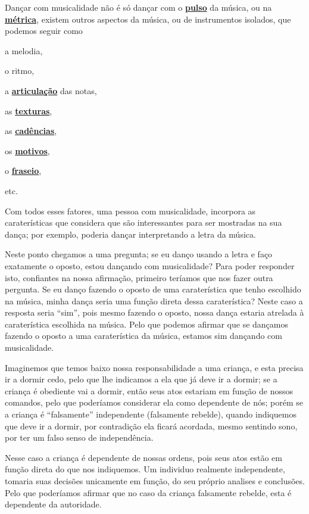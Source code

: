 Dançar com musicalidade não é só dançar com o \hyperref[ref:Pulso]{\textbf{pulso}} da música, 
ou na \hyperref[def:Metrica]{\textbf{métrica}},
existem outros aspectos da música, ou de instrumentos isolados, que podemos seguir como 
\begin{inparaitem} 
\item a melodia, 
\item o ritmo,
\item a \hyperref[sub:Articulation]{\textbf{articulação}} das notas, 
\item as \hyperref[sec:texturasmusica]{\textbf{texturas}}, 
\item as \hyperref[sec:Cadencia]{\textbf{cadências}}, 
\item os \hyperref[sec:Motivo]{\textbf{motivos}}, 
\item o \hyperref[sec:fraseio]{\textbf{fraseio}}, 
\item etc.
\end{inparaitem} 
Com todos esses fatores, uma pessoa com musicalidade, 
incorpora as caraterísticas que considera que são interessantes para 
ser mostradas na sua dança; por exemplo, poderia dançar interpretando a letra da música.

Neste ponto chegamos a uma pregunta; se eu danço usando a letra e faço exatamente o oposto,
estou dançando com musicalidade?
Para poder responder isto, confiantes na nossa afirmação,
primeiro teríamos que nos fazer outra pergunta.
Se eu danço fazendo o oposto de uma caraterística que tenho escolhido na música,
minha dança seria uma função direta dessa caraterística?
Neste caso a resposta seria ``sim'', pois mesmo fazendo o oposto,
nossa dança estaria atrelada à caraterística escolhida na música.
Pelo que podemos afirmar que se dançamos fazendo o oposto a uma caraterística da música, 
estamos sim dançando com musicalidade.
\begin{example}
Imaginemos que temos baixo nossa responsabilidade a uma criança,
e esta precisa ir a dormir cedo, pelo que lhe indicamos a ela que já deve ir a dormir;
se a criança é obediente vai a dormir, então seus atos estariam em função de nossos comandos,
pelo que poderíamos considerar ela como dependente de nós;
porém se a criança é ``falsamente'' independente (falsamente rebelde), quando indiquemos que deve ir a dormir,
por contradição ela ficará acordada, mesmo sentindo sono, por ter um falso senso de independência.

Nesse caso a criança é dependente de nossas ordens,
pois seus atos estão em função direta do que nos indiquemos.
Um individuo realmente independente, tomaria suas decisões unicamente em função,
do seu próprio analises e conclusões.
Pelo que poderíamos afirmar que no caso da criança falsamente rebelde, esta é dependente da autoridade.
\end{example}

